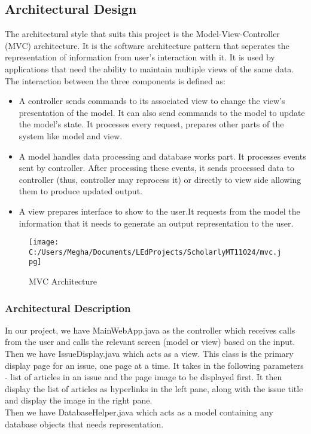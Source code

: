 \documentclass[amsart, 12pt]{article}
\begin{document}
\subsection{Architectural Design}
The architectural style that suits this project is the Model-View-Controller (MVC) architecture. It is the software architecture pattern that seperates the representation of information from user's interaction with it. It is used by applications that need the ability to maintain multiple views of the same data. The interaction between the three components is defined as: \\

\begin{itemize}
\item A controller sends commands to its associated view to change the view's presentation of the model. It can also send commands to the model to update the model's state. It processes every request, prepares other parts of the system like model and view.

\item A model handles data processing and database works part. It processes events sent by controller. After processing these events, it sends processed data to controller (thus, controller may reprocess it) or directly to view side allowing them to produce updated output.

\item A view prepares interface to show to the user.It requests from the model the information that it needs to generate an output representation to the user.\\
\end{itemize}
\begin{figure}[ht!]
\centering
\texttt{[image: C:/Users/Megha/Documents/LEdProjects/ScholarlyMT11024/mvc.jpg]}
\caption{MVC Architecture}
\label{fig:Phase 2}
\end{figure}

\subsubsection{Architectural Description}
In our project, we have MainWebApp.java as the controller which receives calls from the user and calls the relevant screen (model or view) based on the input.\\
Then we have IssueDisplay.java which acts as a view. This class is the primary display page for an issue, one page at a time.  It takes in the following parameters - list of articles in an issue and the page image to be displayed first.
It then display the list of articles as hyperlinks in the left pane, along with the issue title and display the image in the right pane. \\
Then we have DatabaseHelper.java which acts as a model containing any database objects that needs representation.
\end{document}
